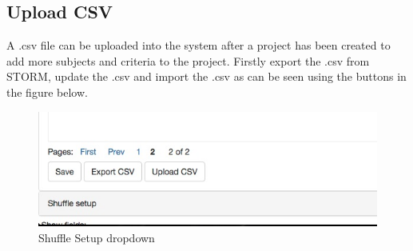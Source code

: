 \subsection{Upload CSV}\par
A .csv file can be uploaded into the system after a project has been created to add more subjects and criteria to the project. Firstly export the .csv from STORM, update the .csv and import the .csv as can be seen using the buttons in the figure below.\par
 \begin{figure}[H] 
	\centering
	\includegraphics[width=13cm]{./graphics/UploadCSV.jpg}\par
	\caption{Shuffle Setup dropdown}
\end{figure}
